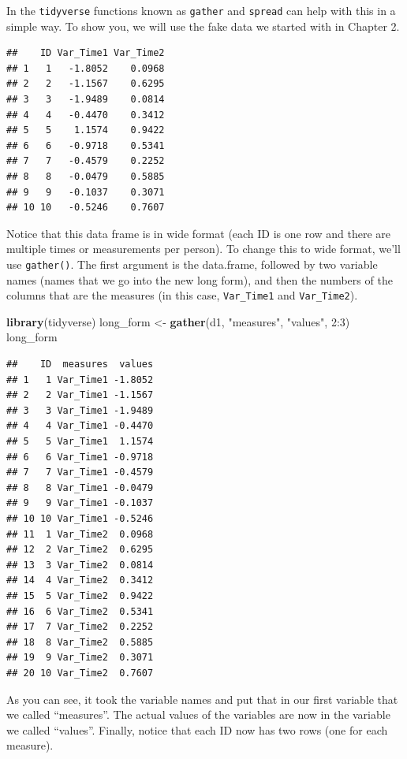 \documentclass[]{tufte-book}
\newenvironment{Shaded}{}{}
\newcommand{\KeywordTok}[1]{\textcolor[rgb]{0.00,0.44,0.13}{\textbf{#1}}}
\newcommand{\DecValTok}[1]{\textcolor[rgb]{0.25,0.63,0.44}{#1}}
\newcommand{\StringTok}[1]{\textcolor[rgb]{0.25,0.44,0.63}{#1}}
\newcommand{\OperatorTok}[1]{\textcolor[rgb]{0.40,0.40,0.40}{#1}}
\newcommand{\NormalTok}[1]{#1}
\theoremstyle{definition}
\theoremstyle{definition}
\theoremstyle{remark}
\begin{document}
In the \texttt{tidyverse} functions known as \texttt{gather} and
\texttt{spread} can help with this in a simple way. To show you, we will
use the fake data we started with in Chapter 2.

\begin{verbatim}
##    ID Var_Time1 Var_Time2
## 1   1   -1.8052    0.0968
## 2   2   -1.1567    0.6295
## 3   3   -1.9489    0.0814
## 4   4   -0.4470    0.3412
## 5   5    1.1574    0.9422
## 6   6   -0.9718    0.5341
## 7   7   -0.4579    0.2252
## 8   8   -0.0479    0.5885
## 9   9   -0.1037    0.3071
## 10 10   -0.5246    0.7607
\end{verbatim}

Notice that this data frame is in wide format (each ID is one row and
there are multiple times or measurements per person). To change this to
wide format, we'll use \texttt{gather()}. The first argument is the
data.frame, followed by two variable names (names that we go into the
new long form), and then the numbers of the columns that are the
measures (in this case, \texttt{Var\_Time1} and \texttt{Var\_Time2}).

\begin{Shaded}
\begin{Highlighting}[]
\KeywordTok{library}\NormalTok{(tidyverse)}
\NormalTok{long_form <-}\StringTok{ }\KeywordTok{gather}\NormalTok{(d1, }\StringTok{"measures"}\NormalTok{, }\StringTok{"values"}\NormalTok{, }
    \DecValTok{2}\OperatorTok{:}\DecValTok{3}\NormalTok{)}
\NormalTok{long_form}
\end{Highlighting}
\end{Shaded}

\begin{verbatim}
##    ID  measures  values
## 1   1 Var_Time1 -1.8052
## 2   2 Var_Time1 -1.1567
## 3   3 Var_Time1 -1.9489
## 4   4 Var_Time1 -0.4470
## 5   5 Var_Time1  1.1574
## 6   6 Var_Time1 -0.9718
## 7   7 Var_Time1 -0.4579
## 8   8 Var_Time1 -0.0479
## 9   9 Var_Time1 -0.1037
## 10 10 Var_Time1 -0.5246
## 11  1 Var_Time2  0.0968
## 12  2 Var_Time2  0.6295
## 13  3 Var_Time2  0.0814
## 14  4 Var_Time2  0.3412
## 15  5 Var_Time2  0.9422
## 16  6 Var_Time2  0.5341
## 17  7 Var_Time2  0.2252
## 18  8 Var_Time2  0.5885
## 19  9 Var_Time2  0.3071
## 20 10 Var_Time2  0.7607
\end{verbatim}

As you can see, it took the variable names and put that in our first
variable that we called ``measures''. The actual values of the variables
are now in the variable we called ``values''. Finally, notice that each
ID now has two rows (one for each measure).
\end{document}
